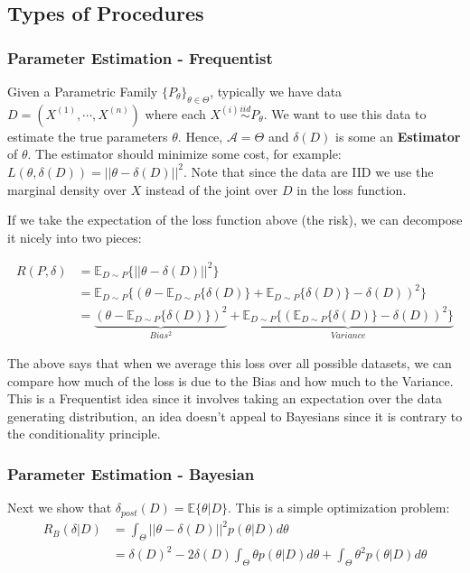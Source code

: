 \documentclass[]{article}
\theoremstyle{mattstyle}
\theoremstyle{definition}
\begin{document}
\subsection{Types of Procedures}

\subsubsection{Parameter Estimation - Frequentist}
Given a Parametric Family $\{P_{\theta}\}_{\theta\in\Theta}$, typically we have data \(D=(X^{(1)}, \cdots, X^{(n)})\) where each \(X^{(i)}\overset{iid}{\sim} P_{\theta}\). We want to use this data to estimate the true parameters \(\theta\). Hence, \(\mathcal{A} = \Theta\) and $\delta(D)$ is some an \textbf{Estimator} of \(\theta\). The estimator should minimize some cost, for example: \(L(\theta,\delta(D)) = ||\theta-\delta(D)||^2\). Note that since the data are IID we use the marginal density over $X$ instead of the joint over $D$ in the loss function.

If we take the expectation of the loss function above (the risk), we can decompose it nicely into two pieces:

\begin{align*}
R(P,\delta)&=\mathbb{E}_{D\sim P}\{||\theta-\delta(D)||^2\}\\
&=\mathbb{E}_{D\sim P}\{(\theta-\mathbb{E}_{D\sim P}\{\delta(D)\} + \mathbb{E}_{D\sim P}\{\delta(D)\} - \delta(D))^2\}\\
&=\underbrace{(\theta-\mathbb{E}_{D\sim P}\{\delta(D)\})^2}_{Bias^2} + \underbrace{\mathbb{E}_{D\sim P}\{(\mathbb{E}_{D\sim P}\{\delta(D)\} - \delta(D))^2\}}_{Variance}
\end{align*}

The above says that when we average this loss over all possible datasets, we can compare how much of the loss is due to the Bias and how much to the Variance. This is a Frequentist idea since it involves taking an expectation over the data generating distribution, an idea doesn't appeal to Bayesians since it is contrary to the conditionality principle. 

\subsubsection{Parameter Estimation - Bayesian}

Next we show that \(\delta_{post}(D) = \mathbb{E}\{\theta|D\}\). This is a simple optimization problem:
\begin{align*}
R_B(\delta|D) &= \int_{\Theta}^{}||\theta-\delta(D)||^2p(\theta|D)d\theta \\
&=\delta(D)^2 -2\delta(D)\int_{\Theta}^{}\theta p(\theta|D)d\theta+\int_{\Theta}^{}\theta^2 p(\theta|D)d\theta
\end{align*}
\end{document}
